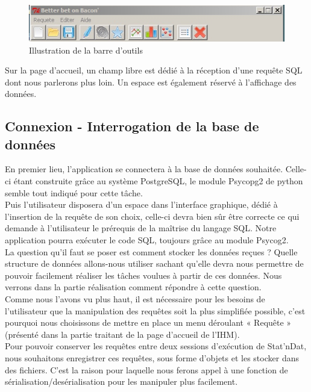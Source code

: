 \documentclass[a4paper,10pt]{report}
\begin{document}
\begin{figure}[H]

\centering
\includegraphics[scale=0.6]{barre.jpg}
\caption{Illustration de la barre d'outils}

\end{figure} 


Sur la page d’accueil, un champ libre est dédié à la réception d’une requête SQL dont nous parlerons plus loin. Un espace est également réservé à l’affichage des données.


\subsection{Connexion - Interrogation de la base de données}


En premier lieu, l'application se connectera à la base de données souhaitée. Celle-ci étant construite grâce au système PostgreSQL, le module Psycopg2 de python semble tout indiqué pour cette tâche.\\

Puis l'utilisateur disposera d'un espace dans l'interface graphique, dédié à l'insertion de la requête de son choix, celle-ci devra bien sûr être correcte ce qui demande à l’utilisateur le prérequis de la maîtrise du langage SQL.  Notre application pourra exécuter le code SQL, toujours grâce au module Psycog2.\\

La question qu’il faut se poser est comment stocker les données reçues ? Quelle structure de données allons-nous utiliser sachant qu’elle devra nous permettre de pouvoir facilement réaliser les tâches voulues à partir de ces données. Nous verrons dans la partie réalisation comment répondre à cette question.\\

Comme nous l’avons vu plus haut, il est nécessaire pour les besoins de l’utilisateur que la manipulation des requêtes soit la plus simplifiée possible, c’est pourquoi nous choisissons de mettre en place un menu déroulant « Requête » (présenté dans la partie traitant de la page d’accueil de l’IHM).\\

Pour pouvoir conserver les requêtes entre deux sessions d’exécution de Stat’nDat, nous souhaitons enregistrer ces requêtes, sous forme d’objets et les stocker dans des fichiers. C’est la raison pour laquelle nous ferons appel à une fonction de sérialisation/desérialisation pour les manipuler plus facilement. \\
\end{document}
